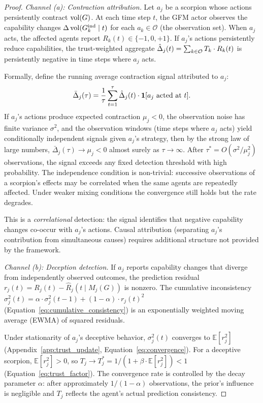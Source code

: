 \begin{proof}
\emph{Channel (a): Contraction attribution.}
Let $a_j$ be a scorpion whose actions persistently contract $\operatorname{vol}(G)$. At
each time step $t$, the GFM actor observes the capability changes
$\Delta \operatorname{vol}(G_{k}^{\mathrm{ind}} \mid t)$ for each $a_k \in \mathcal{O}$ (the
observation set). When $a_j$ acts, the affected agents report
$R_k(t) \in \{-1, 0, +1\}$. If $a_j$'s actions persistently reduce
capabilities, the trust-weighted aggregate
$\hat{\Delta}_j(t) = \sum_{k \in \mathcal{O}} T_k \cdot R_k(t)$ is
persistently negative in time steps where $a_j$ acts.

Formally, define the running average contraction signal attributed to $a_j$:
\[
\bar{\Delta}_j(\tau) = \frac{1}{\tau} \sum_{t=1}^{\tau}
  \hat{\Delta}_j(t) \cdot \mathbf{1}[a_j \text{ acted at } t].
\]
If $a_j$'s actions produce expected contraction $\mu_j < 0$, the observation
noise has finite variance $\sigma^2$, and the observation windows
(time steps where $a_j$ acts) yield conditionally independent signals given
$a_j$'s strategy, then by the strong law of large numbers,
$\bar{\Delta}_j(\tau) \to \mu_j < 0$ almost surely as $\tau \to \infty$.
After $\tau^* = O(\sigma^2 / \mu_j^2)$ observations, the signal exceeds any
fixed detection threshold with high probability. The independence condition
is non-trivial: successive observations of a scorpion's effects may be
correlated when the same agents are repeatedly affected. Under weaker mixing
conditions the convergence still holds but the rate degrades.

This is a \emph{correlational} detection: the signal identifies that negative
capability changes co-occur with $a_j$'s actions. Causal attribution
(separating $a_j$'s contribution from simultaneous causes) requires
additional structure not provided by the framework.

\emph{Channel (b): Deception detection.}
If $a_j$ reports capability changes that diverge from independently observed
outcomes, the prediction residual $r_j(t) = R_j(t) - \hat{R}_j(t \mid
M_j(G))$ is nonzero. The cumulative inconsistency
$\sigma_j^2(t) = \alpha \cdot \sigma_j^2(t-1) + (1-\alpha) \cdot r_j(t)^2$
(Equation~\eqref{eq:cumulative_consistency}) is an exponentially weighted
moving average (EWMA) of squared residuals.

Under stationarity of $a_j$'s deceptive behavior, $\sigma_j^2(t)$ converges
to $\mathbb{E}[r_j^2]$ (Appendix~\ref{app:trust_update},
Equation~\eqref{eq:convergence}). For a deceptive scorpion,
$\mathbb{E}[r_j^2] > 0$, so
$T_j \to T_j^* = 1/(1 + \beta \cdot \mathbb{E}[r_j^2]) < 1$
(Equation~\eqref{eq:trust_factor}). The convergence rate is controlled by
the decay parameter $\alpha$: after approximately $1/(1-\alpha)$ observations,
the prior's influence is negligible and $T_j$ reflects the agent's actual
prediction consistency.


\end{proof}
